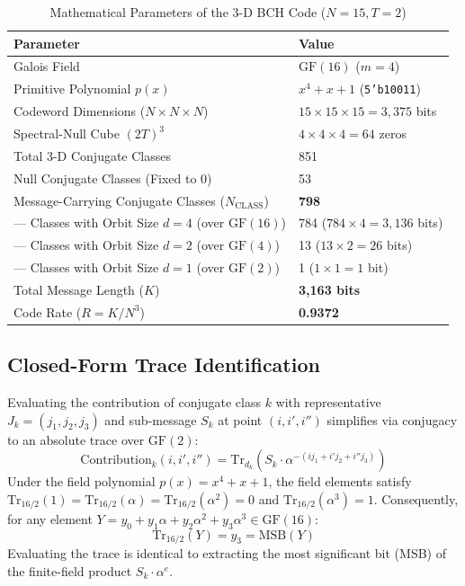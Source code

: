 \documentclass[11pt,a4paper]{article}
\begin{document}
\begin{table}[htbp]
\centering
\caption{Mathematical Parameters of the 3-D BCH Code ($N=15, T=2$)}
\label{tab:code_params}
\vspace{0.2cm}
\begin{tabular}{ll}
\toprule
\textbf{Parameter} & \textbf{Value} \\
\midrule
Galois Field & $\text{GF}(16)$ ($m=4$) \\
Primitive Polynomial $p(x)$ & $x^4 + x + 1$ (\texttt{5'b10011}) \\
Codeword Dimensions ($N \times N \times N$) & $15 \times 15 \times 15 = 3,375$ bits \\
Spectral-Null Cube $(2T)^3$ & $4 \times 4 \times 4 = 64$ zeros \\
Total 3-D Conjugate Classes & 851 \\
Null Conjugate Classes (Fixed to 0) & 53 \\
Message-Carrying Conjugate Classes ($N_{\text{CLASS}}$) & \textbf{798} \\
--- Classes with Orbit Size $d=4$ (over $\text{GF}(16)$) & 784 ($784 \times 4 = 3,136$ bits) \\
--- Classes with Orbit Size $d=2$ (over $\text{GF}(4)$)  & 13 ($13 \times 2 = 26$ bits) \\
--- Classes with Orbit Size $d=1$ (over $\text{GF}(2)$)  & 1 ($1 \times 1 = 1$ bit) \\
Total Message Length ($K$) & \textbf{3,163 bits} \\
Code Rate ($R = K / N^3$) & \textbf{0.9372} \\
\bottomrule
\end{tabular}
\end{table}

\subsection{Closed-Form Trace Identification}
Evaluating the contribution of conjugate class $k$ with representative $J_k = (j_1, j_2, j_3)$ and sub-message $S_k$ at point $(i, i', i'')$ simplifies via conjugacy to an absolute trace over $\text{GF}(2)$:
\begin{equation}
\text{Contribution}_k(i, i', i'') = \mathrm{Tr}_{d_k}\left( S_k \cdot \alpha^{-(i j_1 + i' j_2 + i'' j_3)} \right)
\end{equation}
Under the field polynomial $p(x) = x^4 + x + 1$, the field elements satisfy $\mathrm{Tr}_{16/2}(1) = \mathrm{Tr}_{16/2}(\alpha) = \mathrm{Tr}_{16/2}(\alpha^2) = 0$ and $\mathrm{Tr}_{16/2}(\alpha^3) = 1$. Consequently, for any element $Y = y_0 + y_1 \alpha + y_2 \alpha^2 + y_3 \alpha^3 \in \text{GF}(16)$:
\begin{equation}
\mathrm{Tr}_{16/2}(Y) = y_3 = \text{MSB}(Y)
\end{equation}
Evaluating the trace is identical to extracting the most significant bit (MSB) of the finite-field product $S_k \cdot \alpha^e$.
\end{document}
